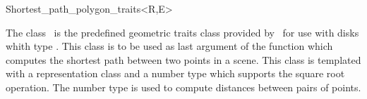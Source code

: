 
\begin{ccRefClass}{Shortest_path_polygon_traits<R,E>}
\label{pageShortest_path_polygon_traitsRef}

\ccDefinition

The class \ccRefName\ is the predefined geometric traits class provided by
\cgal\ for use with disks whith type .
This class is to be used as last argument of the  function
which computes the shortest path between two points in a scene.
This class is templated with a representation class  and a number type
 which supports the square root operation. The number type  is
used to compute distances between pairs of points.


\ccInheritsFrom
{}

\ccIsModel
{}

\ccSeeAlso

 \\

\ccTagDefaults
\end{ccRefClass}
\ccRefPageEnd
